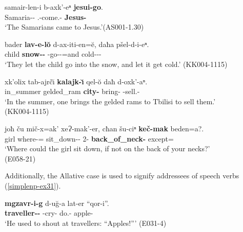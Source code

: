 \begin{exe}
	\ex\label{simplenp-ex30}
	\begin{xlist}
		
			\ex\label{simplenp-ex30a}
			\gll samair-len-i b-axk'-eⁿ \textbf{jesui-go}. \\
			Samaria-{\Adjz}-{\Pl} {\M}.{\Pl}-come.{\Pl}-{\Aor} \textbf{Jesus-{\All}} \\
			\trans `The Samarians came to Jesus.'\hfill\hbox{(AS001-1.30)}
		
		
		
			\ex\label{simplenp-ex30b}
			\gll bader \textbf{lav-e-l\u{o}} d-ax-iti-en=\u{e}, daħa pšel-d-i-eⁿ. \\
			child \textbf{snow-{\Obl}-{\Interlat}} {\D}-go-{\Caus}-{\Aor}=and {\Pv} cold-{\D}-{\Tr}-{\Aor} \\
			\trans `They let the child go into the snow, and let it get cold.'
			\hfill (KK004-1115)
		
		
		
			\ex\label{simplenp-ex30c}
			\gll xk'olix tab-ajrč\u{\i} \textbf{kalajk-\u{\i}} qel-\u{o} daħ d-oxk'-aⁿ. \\
			in\_summer gelded\_ram \textbf{city-{\Ill}} bring-{\Npst} {\Pv} {\D}-sell.{\Pfv}-{\Inf} \\
			\trans `In the summer, one brings the gelded rams to Tbilisi to sell them.' \\
			\hfill (KK004-1115)
		
		
		
			\ex\label{simplenp-ex30d}
			\gll joħ ču mič-x=ak' xeɁ-mak'-er, cħan šu-ciⁿ \textbf{keč-mak} beden=a?. \\
			girl {\Pv} where-{\Cont}={\Indf} sit\_down-{\Pot}-{\Imprf} {\Ptcl} 2{\Pl}-{\Apudess} \textbf{back\_of\_neck-{\Superlat}} except={\Emph} \\
			\trans `Where could the girl sit down, if not on the back of your necks?' \\
			\hfill (E058-21)
		
		
		
	\end{xlist}
\end{exe}

Additionally, the Allative case is used to signify addressees of speech verbs (\ref{simplenp-ex31}).

\begin{exe}
	\ex\label{simplenp-ex31}
	\gll \textbf{mgzavr-i-g} d-u\u{g}-a lat-er ``qor-i''. \\
	\textbf{traveller-{\Pl}-{\All}} {\D}-cry-{\Inf} do.{\Hab}-{\Imprf} apple-{\Pl} \\
	\trans `He used to shout at travellers: ``Apples!{''}'
	\hfill (E031-4)
\end{exe}

